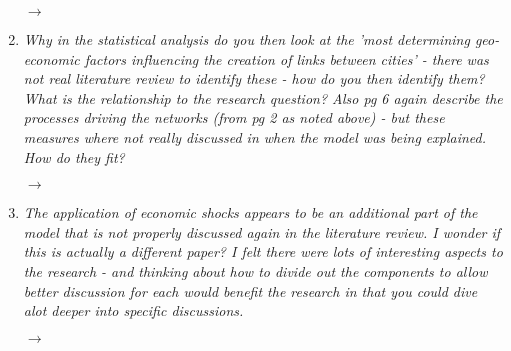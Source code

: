 \documentclass[10pt,a4paper,sans]{moderncv}        %
\begin{document}
\begin{enumerate}
	$\rightarrow$
	
	\medskip

	\item \textit{Why in the statistical analysis do you then look at the 'most determining geo-economic factors influencing the creation of links between cities' - there was not real literature review to identify these - how do you then identify them? What is the relationship to the research question? Also pg 6 again describe the processes driving the networks (from pg 2 as noted above) - but these measures where not really discussed in when the model was being explained. How do they fit?}
	 
	$\rightarrow$
	
	\medskip

	\item \textit{The application of economic shocks appears to be an additional part of the model that is not properly discussed again in the literature review. I wonder if this is actually a different paper? I felt there were lots of interesting aspects to the research - and thinking about how to divide out the components to allow better discussion for each would benefit the research in that you could dive alot deeper into specific discussions.}
	
	$\rightarrow$
	
	\medskip


\end{enumerate}
\end{document}
